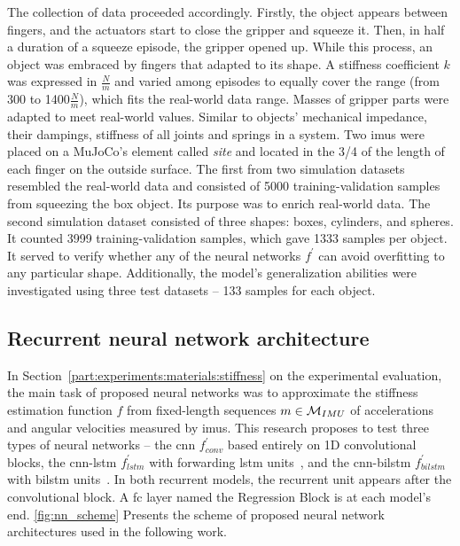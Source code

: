 \documentclass[a4paper, 10pt, twoside]{report}
\begin{document}
The collection of data proceeded accordingly. Firstly, the object appears between fingers, and the actuators start to close the gripper and squeeze it. Then, in half a duration of a squeeze episode, the gripper opened up. While this process, an object was embraced by fingers that adapted to its shape. A stiffness coefficient $k$ was expressed in $\frac{N}{m}$ and varied among episodes to equally cover the range (from 300 to 1400$\frac{N}{m}$), which fits the real-world data range. Masses of gripper parts were adapted to meet real-world values. Similar to objects' mechanical impedance, their dampings, stiffness of all joints and springs in a system. Two \acrshort{imu}s were placed on a MuJoCo's element called \textit{site} and located in the 3/4 of the length of each finger on the outside surface. The first from two simulation datasets resembled the real-world data and consisted of 5000 training-validation samples from squeezing the box object. Its purpose was to enrich real-world data. The second simulation dataset consisted of three shapes: boxes, cylinders, and spheres. It counted 3999 training-validation samples, which gave 1333 samples per object. It served to verify whether any of the neural networks $f^{\prime}$ can avoid overfitting to any particular shape. Additionally, the model's generalization abilities were investigated using three test datasets -- 133 samples for each object.

\subsection{Recurrent neural network architecture}
\label{part:methods:materials:stiffness:models}

In Section~\ref{part:experiments:materials:stiffness} on the experimental evaluation, the main task of proposed neural networks was to approximate the stiffness estimation function $f$ from fixed-length sequences $m \in {\cal M}_{IMU}$ of accelerations and angular velocities measured by \acrshort{imu}s. This research proposes to test three types of neural networks -- the \acrshort{cnn} $f^{\prime}_{conv}$ based entirely on 1D convolutional blocks, the \acrshort{cnn}-\acrshort{lstm} $f^{\prime}_{lstm}$ with forwarding \acrfull{lstm} units~\cite{LSTM}, and the \acrshort{cnn}-\acrshort{bilstm} $f^{\prime}_{bilstm}$ with \acrfull{bilstm} units~\cite{BiDirRNN}. In both recurrent models, the recurrent unit appears after the convolutional block. A \acrshort{fc} layer named the Regression Block is at each model's end. \Figure\ref{fig:nn_scheme} Presents the scheme of proposed neural network architectures used in the following work.
\end{document}
